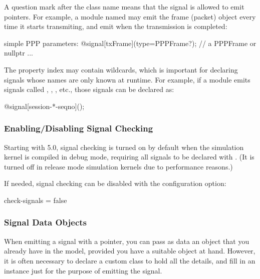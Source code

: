 A question mark after the class name means that the signal is allowed to
emit  pointers. For example, a module named  may emit
the frame (packet) object every time it starts transmiting, and emit
 when the transmission is completed:

\begin{ned}
simple PPP
{
    parameters:
        @signal[txFrame](type=PPPFrame?);  // a PPPFrame or nullptr
        ...
}
\end{ned}

The property index may contain wildcards, which is important for declaring
signals whose names are only known at runtime. For example, if a module emits
signals called , , ,
etc., those signals can be declared as:

\begin{ned}
    @signal[session-*-seqno]();
\end{ned}


\subsubsection{Enabling/Disabling Signal Checking}
\label{sec:simple-modules:enabling-signal-checking}

Starting with {\opp} 5.0, signal checking is turned on by default when the
simulation kernel is compiled in debug mode, requiring all signals to be
declared with . (It is turned off in release mode
simulation kernels due to performance reasons.)

If needed, signal checking can be disabled with the 
configuration option:

\begin{inifile}
check-signals = false
\end{inifile}


\subsubsection{Signal Data Objects}
\label{sec:simple-modules:signal-data-objects}

When emitting a signal with a  pointer, you can pass as data
an object that you already have in the model, provided you have a suitable
object at hand. However, it is often necessary to declare a custom class
to hold all the details, and fill in an instance just for the purpose of
emitting the signal.

